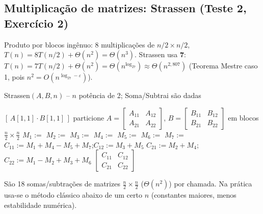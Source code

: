 \subsection{Multiplicação de matrizes: Strassen (Teste 2, Exercício 2)}
Produto por blocos ingênuo: 8 multiplicações de $n/2\times n/2$, $T(n)=8T(n/2)+\Theta(n^2)=\Theta(n^3)$. Strassen usa \textbf{7}: $T(n)=7T(n/2)+\Theta(n^2)=\Theta(n^{\log_27})\approx\Theta(n^{2{,}807})$ (Teorema Mestre caso 1, pois $n^2=O(n^{\log_27-\varepsilon})$).
\begin{pseudo}{Strassen$(A,B,n)$ -- $n$ potência de 2; Soma/Subtrai são dadas}
\begin{algorithmic}
   \State \Return $[\,A[1,1]\cdot B[1,1]\,]$ \EndIf
  \State particione $A=\begin{bmatrix}A_{11}&A_{12}\\A_{21}&A_{22}\end{bmatrix}$, $B=\begin{bmatrix}B_{11}&B_{12}\\B_{21}&B_{22}\end{bmatrix}$ em blocos $\frac n2\times\frac n2$
  \State $M_1:=$ 
  \State $M_2:=$ 
  \State $M_3:=$ 
  \State $M_4:=$ 
  \State $M_5:=$ 
  \State $M_6:=$ 
  \State $M_7:=$ 
  \State $C_{11}:=M_1+M_4-M_5+M_7$;\quad $C_{12}:=M_3+M_5$
  \State $C_{21}:=M_2+M_4$;\quad $C_{22}:=M_1-M_2+M_3+M_6$
  \State \Return $\begin{bmatrix}C_{11}&C_{12}\\C_{21}&C_{22}\end{bmatrix}$
\EndFunction
\end{algorithmic}
\end{pseudo}
São 18 somas/subtrações de matrizes $\frac n2\times\frac n2$ ($\Theta(n^2)$) por chamada. Na prática usa-se o método clássico abaixo de um certo $n$ (constantes maiores, menos estabilidade numérica).


